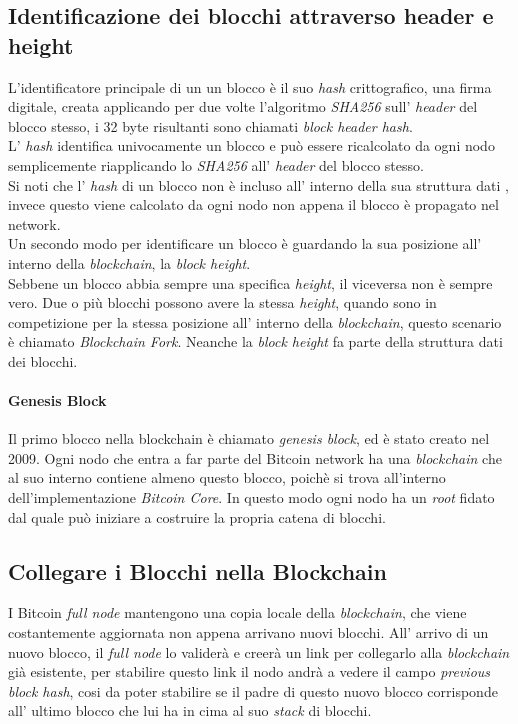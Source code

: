 \subsection{Identificazione dei blocchi attraverso header e height}
L'identificatore principale di un un blocco \`e il suo \textit{hash} crittografico, una firma digitale, creata applicando per due volte l'algoritmo \textit{SHA256} sull' \textit{header} del blocco stesso, i 32 byte risultanti sono chiamati \textit{block header hash}.\\
L' \textit{hash} identifica univocamente un blocco e pu\`o essere ricalcolato da ogni nodo semplicemente riapplicando lo \textit{SHA256} all' \textit{header} del blocco stesso. \\
Si noti che l' \textit{hash} di un blocco non \`e incluso all' interno della sua struttura dati , invece questo viene calcolato da ogni nodo non appena il blocco \`e propagato nel network.\\
Un secondo modo per identificare un blocco \`e guardando la sua posizione all' interno della \textit{blockchain}, la \textit{block height}.\\
Sebbene un blocco abbia sempre una specifica \textit{height}, il viceversa non \`e sempre vero. Due o pi\`u blocchi possono avere la stessa \textit{height}, quando sono in competizione per la stessa posizione all' interno della \textit{blockchain}, questo scenario \`e chiamato \textit{Blockchain Fork}. Neanche la \textit{block height} fa parte della struttura dati dei blocchi.
\paragraph*{Genesis Block} 
Il primo blocco nella blockchain \`e chiamato \textit{genesis block}, ed \`e stato creato nel 2009. Ogni nodo che entra a far parte del Bitcoin network ha una \textit{blockchain} che al suo interno contiene almeno questo blocco, poich\`e si trova all'interno dell'implementazione \textit{Bitcoin Core}. In questo modo ogni nodo ha un \textit{root} fidato dal quale pu\`o iniziare a costruire la propria catena di blocchi.

\subsection{Collegare i Blocchi nella Blockchain}
I Bitcoin \textit{full node} mantengono una copia locale della \textit{blockchain}, che viene costantemente aggiornata non appena arrivano nuovi blocchi. All' arrivo di un nuovo blocco, il \textit{full node} lo valider\`a e creer\`a un link per collegarlo alla \textit{blockchain} gi\`a esistente, per stabilire questo link il nodo andr\`a a vedere il campo \textit{previous block hash}, cosi da poter stabilire se il padre di questo nuovo blocco corrisponde all' ultimo blocco che lui ha in cima al suo \textit{stack} di blocchi.

